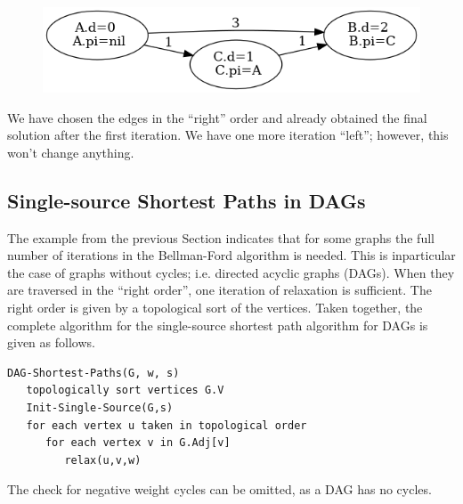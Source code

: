 \begin{figure}[H]
\centering
\includegraphics[scale=0.5]{images/sssp_9.png}
\end{figure}

We have chosen the edges in the ``right'' order and already obtained the final solution after the first iteration. We have one more iteration ``left''; however, this won't change anything.


\subsection{Single-source Shortest Paths in DAGs}

The example from the previous Section indicates that for some graphs the full number of iterations in the Bellman-Ford algorithm is needed. This is inparticular the case of graphs without cycles; i.e. directed acyclic graphs (DAGs). When they are traversed in the ``right order'', one iteration of relaxation is sufficient. The right order is given by a topological sort of the vertices. Taken together, the complete algorithm for the single-source shortest path algorithm for DAGs is given as follows.

\begin{verbatim}
DAG-Shortest-Paths(G, w, s)
   topologically sort vertices G.V
   Init-Single-Source(G,s)
   for each vertex u taken in topological order
      for each vertex v in G.Adj[v]
         relax(u,v,w)
\end{verbatim}

The check for negative weight cycles can be omitted, as a DAG has no cycles.



